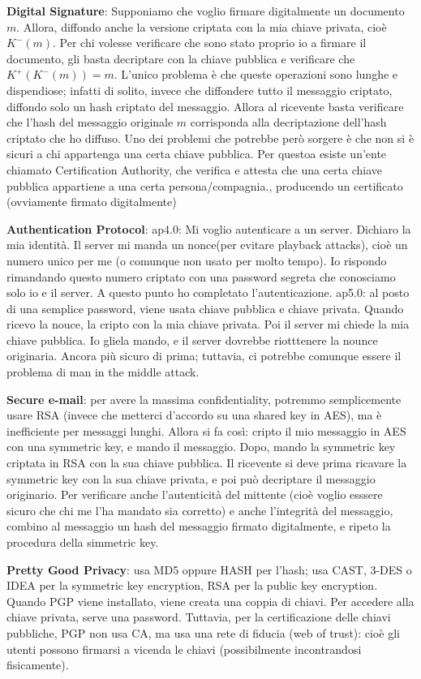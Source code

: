 \documentclass[a4paper,10pt]{article} %
\renewcommand{\b}[1]{%
    {\textbf{#1}}}
\begin{document}
\b{Digital Signature}: Supponiamo che voglio firmare digitalmente un documento $m$. Allora, diffondo anche la versione criptata con la mia chiave privata, cioè $K^-(m)$. Per chi volesse verificare che sono stato proprio io a firmare il documento, gli basta decriptare con la chiave pubblica e verificare che $K^+(K^-(m)) = m$. L'unico problema è che queste operazioni sono lunghe e dispendiose; infatti di solito, invece che diffondere tutto il messaggio criptato, diffondo solo un hash criptato del messaggio. Allora al ricevente basta verificare che l'hash del messaggio originale $m$ corrisponda alla decriptazione dell'hash criptato che ho diffuso. Uno dei problemi che potrebbe però sorgere è che non si è sicuri a chi appartenga una certa chiave pubblica. Per questoa esiste un'ente chiamato Certification Authority, che verifica e attesta che una certa chiave pubblica appartiene a una certa persona/compagnia., producendo un certificato (ovviamente firmato digitalmente)

\b{Authentication Protocol}: ap4.0: Mi voglio autenticare a un server. Dichiaro la mia identità. Il server mi manda un nonce(per evitare playback attacks), cioè un numero unico per me (o comunque non usato per molto tempo). Io rispondo rimandando questo numero criptato con una password segreta che conosciamo solo io e il server. A questo punto ho completato l'autenticazione. ap5.0: al posto di una semplice password, viene usata chiave pubblica e chiave privata. Quando ricevo la nouce, la cripto con la mia chiave privata. Poi il server mi chiede la mia chiave pubblica. Io gliela mando, e il server dovrebbe riotttenere la nounce originaria. Ancora più sicuro di prima; tuttavia, ci potrebbe comunque essere il problema di man in the middle attack.

\b{Secure e-mail}: per avere la massima confidentiality, potremmo semplicemente usare RSA (invece che metterci d'accordo su una shared key in AES), ma è inefficiente per messaggi lunghi. Allora si fa così: cripto il mio messaggio in AES con una symmetric key, e mando il messaggio. Dopo, mando la symmetric key criptata in RSA con la sua chiave pubblica. Il ricevente si deve prima ricavare la symmetric key  con la sua chiave privata, e poi può decriptare il messaggio originario. Per verificare anche l'autenticità del mittente (cioè voglio esssere sicuro che chi me l'ha mandato sia corretto) e anche l'integrità del messaggio, combino al messaggio un hash del messaggio firmato digitalmente, e ripeto la procedura della simmetric key.

\b{Pretty Good Privacy}: usa MD5 oppure HASH per l'hash; usa CAST, 3-DES o IDEA per la symmetric key encryption, RSA per la public key encryption. Quando PGP viene installato, viene creata una coppia di chiavi. Per accedere alla chiave privata, serve una password. Tuttavia, per la certificazione delle chiavi pubbliche, PGP non usa CA, ma usa una rete di fiducia (web of trust): cioè gli utenti possono firmarsi a vicenda le chiavi (possibilmente incontrandosi fisicamente).
\end{document}
